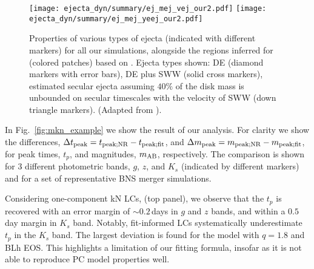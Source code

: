 \begin{figure*}[t]
    \centering 
    \texttt{[image: ejecta\_dyn/summary/ej\_mej\_vej\_our2.pdf]}
    \texttt{[image: ejecta\_dyn/summary/ej\_mej\_yeej\_our2.pdf]}
    \caption{
        Properties of various types of ejecta (indicated with different markers) 
        for all our simulations, alongside the regions inferred for \AT{} 
        (colored patches) based on \citet{Siegel:2019mlp}. 
        Ejecta types shown: \ac{DE} (diamond markers with error bars), 
        \ac{DE} plus \ac{SWW} (solid cross markers), 
        estimated secular ejecta assuming $40\%$ of the disk mass 
        is unbounded on secular timescales with the velocity of \ac{SWW} 
        (down triangle markers).
        (Adapted from \citet{Nedora:2020pak}).
    }
    \label{fig:ejecta:dyn:ds_sww}
\end{figure*}

In Fig.~\ref{fig:mkn_example} we show the result of our analysis. For clarity we 
show the differences, $\Delta t_{\rm peak} = t_{\rm peak; NR} - t_{\rm peak; fit}$, 
and $\Delta m_{\rm peak} = m_{\rm peak; NR} - m_{\rm peak; fit}$, for peak times, 
$t_p$, and magnitudes, $m_{\rm AB}$, respectively. 
The comparison is shown for $3$ different photometric bands, 
$g$, $z$, and $K_s$ (indicated by different markers) 
and for a set of representative \ac{BNS} merger simulations.

Considering one-component \ac{kN} \acp{LC}, (top panel), we observe 
that the $t_p$ is recovered with an error margin of ${\sim}0.2\,$days 
in $g$ and $z$ bands, and within a $0.5\,$day margin in $K_s$ band. 
Notably, fit-informed \acp{LC} systematically underestimate $t_p$ in the 
$K_s$ band. 
%
The largest deviation is found for the 
model with $q=1.8$ and BLh \ac{EOS}. This highlights a limitation of our 
fitting formula, insofar as it is not able to reproduce \ac{PC} model properties well.

